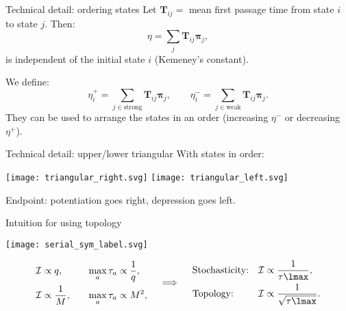 \documentclass[final]{beamer}%
\newcommand{\eq}{\boldsymbol{\pi}}
\newcommand{\fpt}{\mathbf{T}}
\newcommand{\initial}{\mathcal{I}}
\begin{document}
\begin{frame}[label=fr_tech]{Technical detail: ordering states}
%
 Let $\fpt_{ij}=$ mean first passage time from state $i$ to state $j$.
 Then:
 \begin{equation*}
   \eta = \sum_j \fpt_{ij} \eq_j,
 \end{equation*}
 is independent of the initial state $i$
 (Kemeney's constant).\\ 

 \vp We define:
 \begin{equation*}
   \eta^+_i = \sum_{j\in\text{strong}} \fpt_{ij} \eq_j,
   \qquad
   \eta^-_i = \sum_{j\in\text{weak}} \fpt_{ij} \eq_j.
 \end{equation*}
 They can be used to arrange the states in an order (increasing $\eta^-$ or decreasing $\eta^+$).
 \hyperlink{fr_areaproof}{}
%
\end{frame}


\begin{frame}{Technical detail: upper/lower triangular}
%
 With states in order:
 \begin{center}
   \texttt{[image: triangular\_right.svg]}
   \hp \hp \hp
   \texttt{[image: triangular\_left.svg]}
 \end{center}
 Endpoint: potentiation goes right, depression goes left.

 \hyperlink{fr_areaproof}{}
%
\end{frame}


\begin{frame}{Intuition for using topology}
%
 \begin{center}
   \texttt{[image: serial\_sym\_label.svg]}
 \end{center}
%
%
\begin{equation*}
  \begin{aligned}
    \initial &\propto q,
    &\quad
    \max_a \tau_a &\propto \frac{1}{q}, \\
    \initial &\propto \frac{1}{M},
    &
    \max_a \tau_a &\propto M^2, \\
  \end{aligned}
  \quad\implies\quad
  \begin{aligned}
    &\text{Stochasticity:} & \initial &\propto \frac{1}{\tau\lmax}, \\
    &\text{Topology:}      & \initial &\propto \frac{1}{\sqrt{\tau\lmax}}.
  \end{aligned}
\end{equation*}
%

%
\end{frame}
\end{document}
